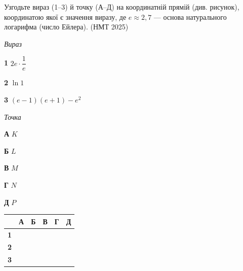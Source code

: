 \documentclass[14pt]{extarticle}
\newcommand{\matchTable}{
\begin{tabular}{|>{\centering\arraybackslash}p{0.25cm}|*{5}{>{\centering\arraybackslash}p{0.25cm}|}}
\hline
& \scriptsize\textbf{А} & \scriptsize\textbf{Б} & \scriptsize\textbf{В} & \scriptsize\textbf{Г} & \scriptsize\textbf{Д} \\
\hline
\scriptsize\textbf{1} & \rule{0pt}{0.25cm} & & & & \\
\hline
\scriptsize\textbf{2} & \rule{0pt}{0.25cm} & & & & \\
\hline
\scriptsize\textbf{3} & \rule{0pt}{0.25cm} & & & & \\
\hline
\end{tabular}
}
\newcommand{\task}[2]{\noindent\makebox[1.5em][l]{\textbf{#1.}}\parbox[t]{\dimexpr\textwidth-1.5em}{#2}}
\newcommand{\nmtyear}[1]{\hfill{\small\color{yearcolor}(НМТ #1)}}
\begin{document}
\task{21}{Узгодьте вираз (1--3) й точку (А--Д) на координатній прямій (див. рисунок), координатою якої є значення виразу, де $e \approx 2{,}7$ --- основа натурального логарифма (число Ейлера). \nmtyear{2025}}

\vspace{0.3cm}
\begin{center}
\end{center}

\vspace{0.3cm}
\noindent
\begin{minipage}[t]{0.3\textwidth}
\vspace{0pt}
\textit{Вираз}

\vspace{0.2cm}
\textbf{1} \quad $2e \cdot \dfrac{1}{e}$

\vspace{0.2cm}
\textbf{2} \quad $\ln 1$

\vspace{0.2cm}
\textbf{3} \quad $(e - 1)(e + 1) - e^2$
\end{minipage}
\hfill
\begin{minipage}[t]{0.35\textwidth}
\vspace{0pt}
\textit{Точка}

\vspace{0.2cm}
\textbf{А} \quad $K$

\vspace{0.2cm}
\textbf{Б} \quad $L$

\vspace{0.2cm}
\textbf{В} \quad $M$

\vspace{0.2cm}
\textbf{Г} \quad $N$

\vspace{0.2cm}
\textbf{Д} \quad $P$
\end{minipage}
\hfill
\begin{minipage}[t]{0.18\textwidth}
\vspace{0pt}
\matchTable
\end{minipage}

\vspace{0.7cm}
\end{document}
